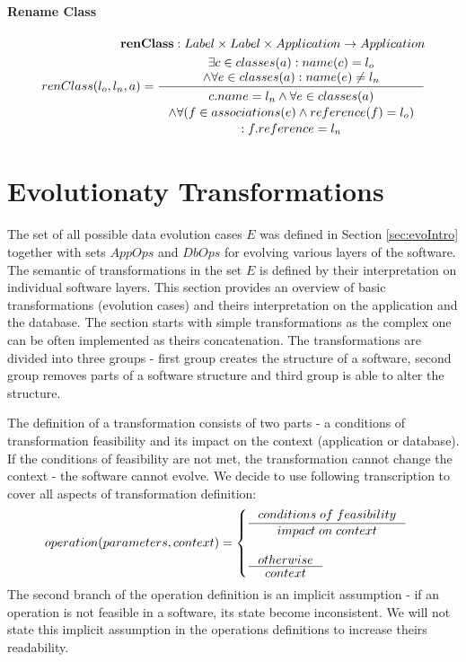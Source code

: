\documentclass[11pt]{article}
\begin{document}
\paragraph{Rename Class}
\begin{align*}
	\mathbf{renClass} :  Label \times Label \times Application \rightarrow Application \\
	renClass(l_o, l_n, a) = \inference{\exists c \in classes(a) : name(c) = l_o \\ \wedge \forall e \in classes(a) : name(e) \neq l_n
	}{\begin{gathered}
		c.name = l_n \wedge \forall e \in classes(a) \\ \wedge \forall (f \in associations(e) \wedge reference(f) = l_o ) \\ : f.reference = l_n 
	\end{gathered}}
\end{align*}



\section{Evolutionaty Transformations}
The set of all possible data evolution cases $E$ was defined in Section \ref{sec:evoIntro} together with sets $AppOps$ and $DbOps$ for evolving various layers of the software. The semantic of transformations in the set $E$ is defined by their interpretation on individual software layers. This section provides an overview of basic transformations (evolution cases) and theirs interpretation on the application and the database. The section starts with simple transformations as the complex one can be often implemented as theirs concatenation. The transformations are divided into three groups - first group creates the structure of a software, second group removes parts of a software structure and third group is able to alter the structure.

The definition of a transformation consists of two parts - a conditions of transformation feasibility and its impact on the context (application or database). If the conditions of feasibility are not met, the transformation cannot change the context - the software cannot evolve.  We decide to use following transcription to cover all aspects of transformation definition:
\begin{align*}
operation(parameters, context) = \begin{cases}
  \inference{conditions \; of \; feasibility}{impact \; on \; context}\\ \\
  \inference{otherwise}{context}
 \end{cases}
\end{align*}
The second branch of the operation definition is an implicit assumption - if an operation is not feasible in a software, its state become inconsistent. We will not state this implicit assumption in the operations definitions to increase theirs readability.
\end{document}
